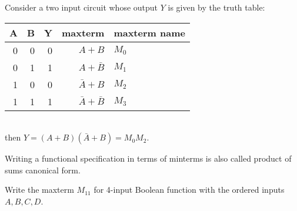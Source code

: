 \noindent Consider a two input circuit whose output $Y$ is given by the truth table:\\
\begin{tabular}{rrrrp{20mm}}
  \toprule
  A & B &  Y & maxterm & maxterm name\\
  \midrule
  0 & 0 &  0 & $A + B$ & $M_0$ \\
  0 & 1 &  1 & $A + \bar{B} $ & $M_1$ \\
  1 & 0 &  0 & $\bar{A} + B$ & $M_2$ \\
  1 & 1 &  1 & $\bar{A} + \bar{B} $ & $M_3$ \\
  \bottomrule
\end{tabular}\\[1em]
then $Y = (A+B)(\bar{A} + B) = M_0M_2$.

\noindent Writing a functional specification in terms of minterms is also called
product of sums canonical form.

\begin{example}
  Write the maxterm $M_{11}$ for 4-input Boolean function with the ordered inputs $A, B, C, D$.
\end{example}


